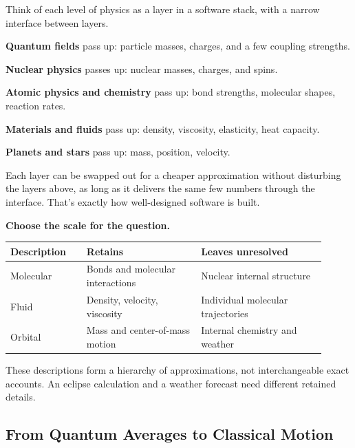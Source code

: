 \begin{examplebox}
Think of each level of physics as a layer in a software stack, with a narrow interface between layers.

\begin{compactchecklist}
\item \textbf{Quantum fields} pass up: particle masses, charges, and a few coupling strengths.
\item \textbf{Nuclear physics} passes up: nuclear masses, charges, and spins.
\item \textbf{Atomic physics and chemistry} pass up: bond strengths, molecular shapes, reaction rates.
\item \textbf{Materials and fluids} pass up: density, viscosity, elasticity, heat capacity.
\item \textbf{Planets and stars} pass up: mass, position, velocity.
\end{compactchecklist}

Each layer can be swapped out for a cheaper approximation without disturbing the layers above, as long as it delivers the same few numbers through the interface. That's exactly how well-designed software is built.
\end{examplebox}

\begin{examplebox}
\textbf{Choose the scale for the question.}\par\smallskip
\begin{tabular}{@{}L{0.22\linewidth}L{0.33\linewidth}L{0.36\linewidth}@{}}
\textbf{Description} & \textbf{Retains} & \textbf{Leaves unresolved} \\
\hline
Molecular & Bonds and molecular interactions & Nuclear internal structure \\
Fluid & Density, velocity, viscosity & Individual molecular trajectories \\
Orbital & Mass and center-of-mass motion & Internal chemistry and weather
\end{tabular}

These descriptions form a hierarchy of approximations, not interchangeable exact accounts. An eclipse calculation and a weather forecast need different retained details.
\end{examplebox}

\subsection{From Quantum Averages to Classical Motion}

